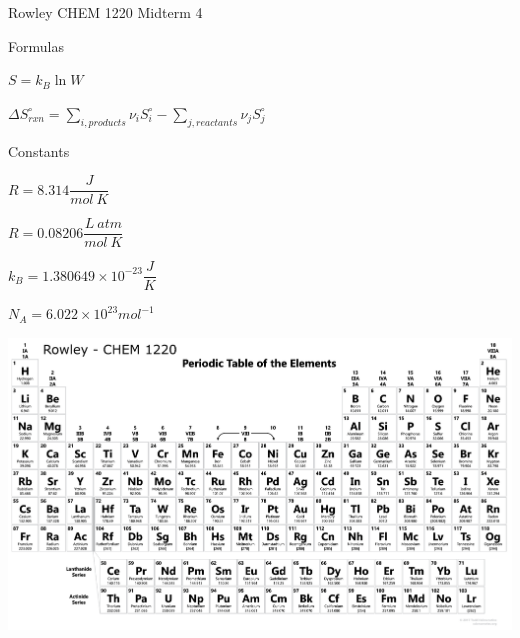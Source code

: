 \documentclass[12pt, letterpaper]{memoir}
\begin{document}
	\pagestyle{empty}
	\begin{center}
		{\Huge Rowley CHEM 1220 Midterm 4}
	\end{center}
	
	{\large Formulas}
	
	\begin{minipage}{0.5\linewidth}
		$S=k_B\ln W$
		
	
	\end{minipage}
	\begin{minipage}{0.5\linewidth}
		$\displaystyle\Delta S^{\circ}_{rxn} = \sum\limits_{i, products} \nu_iS_i^{\circ} - \sum_{j, reactants} \nu_jS_j^{\circ}$
	\end{minipage}
	
	\vspace{2em}

	{\large Constants}
	
	$R=8.314 \dfrac{J}{mol~K}$
	
	$R=0.08206 \dfrac{L~atm}{mol~K}$
	
	$k_B=1.380649 \times 10^{-23} \dfrac{J}{K}$
	
	$N_A=6.022\times10^{23}mol^{-1}$

	


\hspace{6em}	\includegraphics[width=1.3\textwidth, angle =90]{UpdatedTable.png}

	\restoregeometry

	
\end{document}

